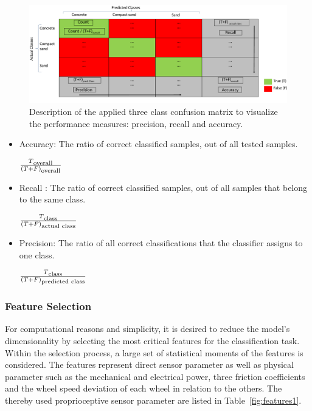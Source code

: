 \documentclass{article}
\begin{document}
\begin{figure}[!htb]
\centering
\includegraphics[width=\textwidth]{../figures/CM_Description.pdf}
\caption{\label{fig:CMdescrpit}Description of the applied three class confusion matrix to visualize the performance measures: precision, recall and accuracy.\cite{kuhr2021}}
\end{figure}
\begin{itemize}
\item Accuracy: The ratio of correct classified samples, out of all tested samples. 

$\frac{T\textsubscript{overall}}{(T+F)\textsubscript{overall}}$

\item Recall : The ratio of correct classified samples, out of all samples that belong to the same class.

$\frac{T\textsubscript{class}}{(T+F)\textsubscript{actual class}}$

\item Precision: The ratio of all correct classifications that the classifier assigns to one class.

$\frac{T\textsubscript{class}}{(T+F)\textsubscript{predicted class}}$

\end{itemize}

\subsubsection{Feature Selection}
For computational reasons and simplicity, it is desired to reduce the model's dimensionality by selecting the most critical features for the  classification task. 
Within the selection process, a large set of statistical moments of the features is considered. The features represent direct sensor parameter as well as physical parameter such as the mechanical and electrical power, three friction coefficients and the wheel speed deviation of each wheel in relation to the others. The thereby used proprioceptive sensor parameter are listed in Table~\ref{fig:features1}.
\end{document}
